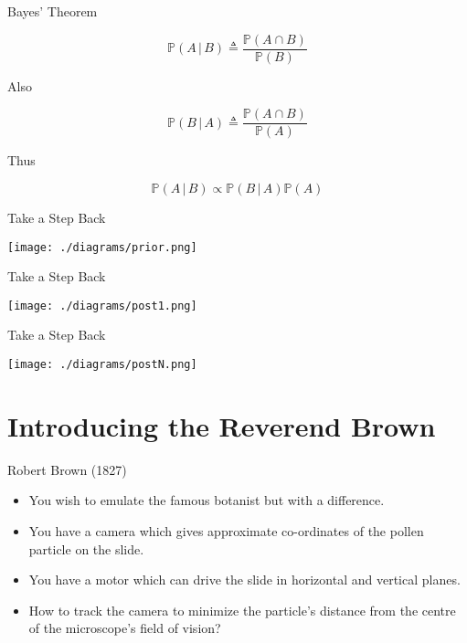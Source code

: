 \documentclass[presentation]{beamer}
\begin{document}
\begin{frame}{Bayes' Theorem}

  $$
  \mathbb{P}(A \,|\, B) \triangleq \frac{\mathbb{P}(A \cap B)}{\mathbb{P}(B)}
  $$

  Also

  $$
  \mathbb{P}(B \,|\, A) \triangleq \frac{\mathbb{P}(A \cap B)}{\mathbb{P}(A)}
  $$

  Thus

  $$
  \mathbb{P}(A \,|\, B) \propto {\mathbb{P}(B \,|\, A)}{\mathbb{P}(A)}
  $$

\end{frame}

\begin{frame}{Take a Step Back}
  \begin{center}
    \texttt{[image: ./diagrams/prior.png]}
  \end{center}
\end{frame}

\begin{frame}{Take a Step Back}
  \begin{center}
    \texttt{[image: ./diagrams/post1.png]}
  \end{center}
\end{frame}

\begin{frame}{Take a Step Back}
  \begin{center}
    \texttt{[image: ./diagrams/postN.png]}
  \end{center}
\end{frame}

\section{Introducing the Reverend Brown}

\begin{frame}{Robert Brown (1827)}

  \begin{itemize}
  \item You wish to emulate the famous botanist but with a difference.
  \item You have a camera which gives approximate co-ordinates of the
    pollen particle on the slide.
  \item You have a motor which can drive the slide in horizontal and
    vertical planes.
  \item How to track the camera to minimize the particle's distance
    from the centre of the microscope's field of vision?
  \end{itemize}

\end{frame}
\end{document}
